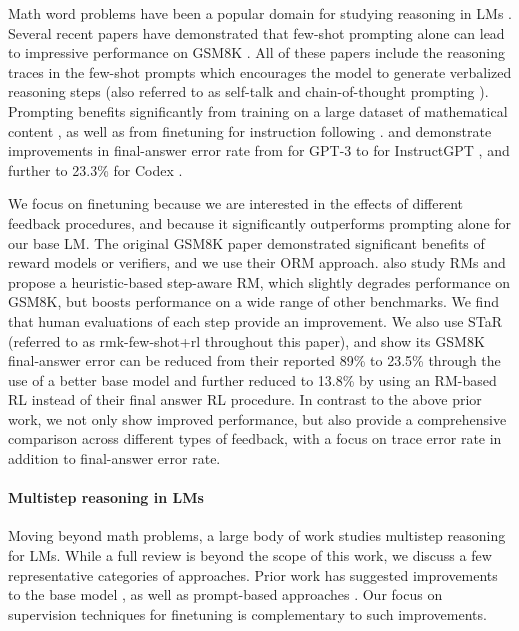 \documentclass[11pt, a4paper, logo]{deepmind}
\newcommand{\ORM}{ORM}
\newcommand{\Short}[1]{\csname rmk-#1\endcsname}
\newcommand{\fewshotANDrl}{\Short{few-shot+rl}}
\begin{document}
{Math word problems have been a popular domain for studying reasoning in LMs \citep{kushman2014learning, ling2017program, amini2019mathqa, miao-etal-2020-diverse, hendrycks2021measuring, cobbe2021training}.
Several recent papers have demonstrated that few-shot prompting alone can lead to impressive performance on GSM8K \citep{chowdhery2022palm, minerva2022, wei2022chain, wang2022self}.
All of these papers include the reasoning traces in the few-shot prompts which encourages the model to generate verbalized reasoning steps (also referred to as self-talk \citep{shwartz2020unsupervised} and chain-of-thought prompting \citep{wei2022chain}).
Prompting benefits significantly from training on a large dataset of mathematical content \citep{minerva2022}, as well as from finetuning for instruction following \citep{ouyang2022training}.
\citet{kojima2022large} and \citet{li2022advance} demonstrate improvements in final-answer error rate from  for GPT-3 \citep{brown2020language} to  for InstructGPT \citep{ouyang2022training}, and further to 23.3\% for Codex \citep{codex2021}.

We focus on finetuning because we are interested in the effects of different feedback procedures, and because it significantly outperforms prompting alone for our base LM.
The original GSM8K paper \citep{cobbe2021training} demonstrated significant benefits of reward models or verifiers, and we use their \ORM{} approach.
\citet{li2022advance} also study RMs and propose a heuristic-based step-aware RM, which slightly degrades performance on GSM8K, but boosts performance on a wide range of other benchmarks.
We find that human evaluations of each step provide an improvement.
We also use STaR \citep{zelikman2022star} (referred to as \fewshotANDrl{} throughout this paper), and show its GSM8K final-answer error can be reduced from their reported 89\% to 23.5\% through the use of a better base model \citep{hoffman2022chinchilla} and further reduced to 13.8\% by using an RM-based RL instead of their final answer RL procedure.
In contrast to the above prior work, we not only show improved performance, but also provide a comprehensive comparison across different types of feedback, with a focus on trace error rate in addition to final-answer error rate.









\paragraph{Multistep reasoning in LMs}
Moving beyond math problems, a large body of work studies multistep reasoning for LMs.
While a full review is beyond the scope of this work, we discuss a few representative categories of approaches.
Prior work has suggested improvements to the base model \citep{minerva2022, ouyang2022training}, as well as prompt-based approaches \citep{perez2020unsupervised, shwartz2020unsupervised, wei2022chain, kojima2022large, dohan2022language}.
Our focus on supervision techniques for finetuning is complementary to such improvements. 


}
\end{document}
